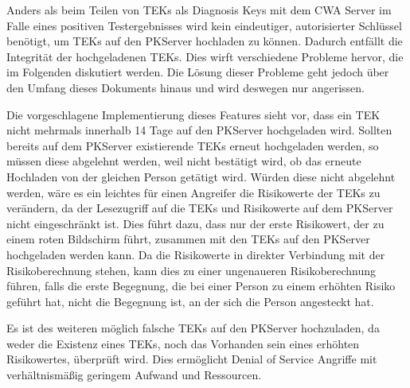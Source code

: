 \documentclass[conference]{IEEEtran}
\begin{document}
Anders als beim Teilen von TEKs als Diagnosis Keys mit dem CWA Server im Falle eines positiven Testergebnisses wird kein eindeutiger, autorisierter Schlüssel benötigt, um TEKs auf den PKServer hochladen zu können.
Dadurch entfällt die Integrität der hochgeladenen TEKs.
Dies wirft verschiedene Probleme hervor, die im Folgenden diskutiert werden. 
Die Lösung dieser Probleme geht jedoch über den Umfang dieses Dokuments hinaus und wird deswegen nur angerissen.

Die vorgeschlagene Implementierung dieses Features sieht vor, dass ein TEK nicht mehrmals innerhalb 14 Tage auf den PKServer hochgeladen wird.
Sollten bereits auf dem PKServer existierende TEKs erneut hochgeladen werden, so müssen diese abgelehnt werden, weil nicht bestätigt wird, ob das erneute Hochladen von der gleichen Person getätigt wird.
Würden diese nicht abgelehnt werden, wäre es ein leichtes für einen Angreifer die Risikowerte der TEKs zu verändern, da der Lesezugriff auf die TEKs und Risikowerte auf dem PKServer nicht eingeschränkt ist.
Dies führt dazu, dass nur der erste Risikowert, der zu einem roten Bildschirm führt, zusammen mit den TEKs auf den PKServer hochgeladen werden kann.
Da die Risikowerte in direkter Verbindung mit der Risikoberechnung stehen, kann dies zu einer ungenaueren Risikoberechnung führen, 
falls die erste Begegnung, die bei einer Person zu einem erhöhten Risiko geführt hat, nicht die Begegnung ist, an der sich die Person angesteckt hat.

Es ist des weiteren möglich falsche TEKs auf den PKServer hochzuladen, da weder die Existenz eines TEKs, noch das Vorhanden sein eines erhöhten Risikowertes, überprüft wird.
Dies ermöglicht Denial of Service Angriffe mit verhältnismäßig geringem Aufwand und Ressourcen.\\
\end{document}
